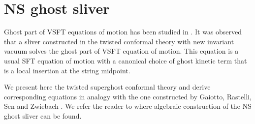 \documentclass[a4paper,12pt]{article}
\begin{document}

\section {NS ghost sliver}

Ghost part of VSFT equations of motion has been studied in
\cite{0108150,0111129}.
 It was observed that a sliver constructed in the twisted conformal theory
with new \coordHE{} invariant vacuum
solves the ghost part of VSFT  equation of motion.
This equation is a usual SFT  equation of motion with a canonical choice
of ghost kinetic term
that is a local insertion at the  string midpoint.

We present here the twisted superghost conformal theory
and derive corresponding equations in analogy with the one
constructed by Gaiotto, Rastelli, Sen and
Zwiebach \cite{0111129}. We refer the reader to \cite{ia_nsgs} where algebraic construction
of the NS ghost sliver can be found.
\end{document}
